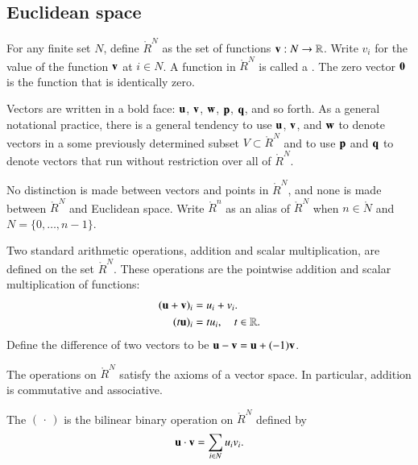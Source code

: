 \subsection{Euclidean space}

\begin{definition}
  For any finite set $N$, define $\ring{R}^N$ as the set of functions
  ${\mathbf v}:N\to\mathbb{R}$. Write $v_i$ for the value of the function ${\mathbf v}$ at
  $i\in N$.  %
  A function in $\ring{R}^N$ is called a .  The zero
  vector ${\mathbf 0}$ is the function that is identically zero.
\end{definition}
%
Vectors are written in a bold face: ${\mathbf u}$, ${\mathbf v}$, ${\mathbf w}$, ${\mathbf p}$, ${\mathbf q}$, and
so forth.  As a general notational practice, there is a general
tendency to use ${\mathbf u}$, ${\mathbf v}$, and ${\mathbf w}$ to denote vectors in a some
previously determined subset $V\subset \ring{R}^N$ and to use ${\mathbf p}$
and ${\mathbf q}$ to denote vectors that run without restriction over all of
$\ring{R}^N$.

No distinction is made between vectors and points in $\ring{R}^N$, and
none is made between $\ring{R}^N$ and Euclidean space.  Write
$\ring{R}^n$ as an alias of $\ring{R}^N$ when $n\in\ring{N}$ and
$N=\{0,\ldots,n-1\}$.  

\begin{definition} %
  Two standard arithmetic operations, addition and scalar
  multiplication, are defined on the set $\ring{R}^N$.  These
  operations are the pointwise addition and scalar multiplication of
  functions:
\begin{align}
({\mathbf u} + {\mathbf v})_i &= u_i + v_i.\nonumber\\
(t {\mathbf u})_i &= t u_i,\quad t\in\mathbb{R}.
\end{align}
%
%
Define the difference of two vectors to be ${\mathbf u} - {\mathbf v} = {\mathbf u} + (-1) {\mathbf v}$.
%
\end{definition}
The operations on $\ring{R}^N$ 
satisfy the axioms of a vector space. 
In particular, addition is commutative and associative.


\begin{definition}
\label{def:dot}
The   $(\,\cdot\,)$ is the
 bilinear binary operation on $\ring{R}^N$
defined by
\[ 
{\mathbf u}\cdot {\mathbf v} = \sum_{i\in N} u_i v_i.
\] 
%
%
\end{definition}


